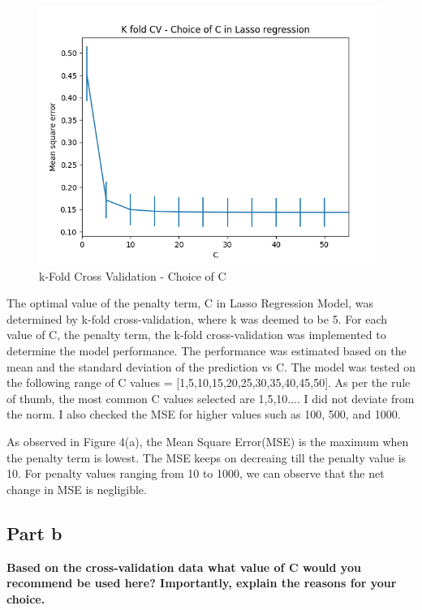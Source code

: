 \documentclass[10pt]{article}
\begin{document}
\begin{figure}[hbt!]
  \begin{center}
    \includegraphics[scale=0.4]{./images/Figure_4.png}
    \caption{k-Fold Cross Validation - Choice of C}
  \end{center}
\end{figure}

The optimal value of the penalty term, C in Lasso Regression Model, was determined by k-fold
cross-validation, where k was deemed to be 5. For each value of C, the penalty term, the k-fold
cross-validation was implemented to determine the model performance. The performance was estimated
based on the mean and the standard deviation of the prediction vs C.
The model was tested on the following range of C values = [1,5,10,15,20,25,30,35,40,45,50]. As per
the rule of thumb, the most common C values selected are 1,5,10.... I did not deviate from the norm.
I also checked the MSE for  higher values such as 100, 500, and 1000.


As observed in Figure 4(a), the Mean Square Error(MSE) is the maximum when the penalty term is lowest.
The MSE keeps on decreaing till the penalty value is 10. For penalty values ranging from 10 to 1000, we
can observe that the net change in MSE is negligible.

\subsection*{Part b}
\textbf{Based on the cross-validation data what value of C would you recommend be
  used here? Importantly, explain the reasons for your choice.}
\end{document}
